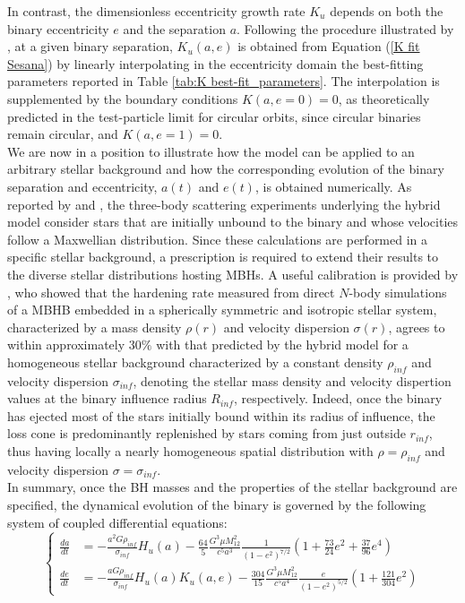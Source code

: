 \documentclass[12pt,twoside,openany]{book}
\begin{document}
In contrast, the dimensionless eccentricity growth rate $K_u$ depends on both the binary eccentricity $e$ and the separation $a$. Following the procedure illustrated by \textcite{Sesana_2010}, at a given binary separation, $K_u(a,e)$ is obtained from Equation (\ref{K fit Sesana}) by linearly interpolating in the eccentricity domain the best-fitting parameters reported in Table \ref{tab:K best-fit_parameters}. The interpolation is supplemented by the boundary conditions $K(a,e=0)=0$, as theoretically predicted in the test-particle limit for circular orbits, since circular binaries remain circular, and $K(a,e=1)=0$.\\We are now in a position to illustrate how the model can be applied to an arbitrary stellar background and how the corresponding evolution of the binary separation and eccentricity, $a(t)$ and $e(t)$, is obtained numerically. As reported by \textcite{Quinlan_1996} and \textcite{Sesana_2006}, the three-body scattering experiments underlying the hybrid model consider stars that are initially unbound to the binary and whose velocities follow a Maxwellian distribution. Since these calculations are performed in a specific stellar background, a prescription is required to extend their results to the diverse stellar distributions hosting MBHs. A useful calibration is provided by \textcite{Sesana_2015}, who showed that the hardening rate measured from direct $N$-body simulations of a MBHB embedded in a spherically symmetric and isotropic stellar system, characterized by a mass density $\rho(r)$ and velocity dispersion $\sigma(r)$, agrees to within approximately $30\%$ with that predicted by the hybrid model for a homogeneous stellar background characterized by a constant density $\rho_{inf}$ and velocity dispersion $\sigma_{inf}$, denoting the stellar mass density and velocity dispertion values at the binary influence radius $R_{inf}$, respectively. Indeed, once the binary has ejected most of the stars initially bound within its radius of influence, the loss cone is predominantly replenished by stars coming from just outside $r_{inf}$, thus having locally a nearly homogeneous spatial distribution with $\rho=\rho_{inf}$ and velocity dispersion $\sigma=\sigma_{inf}$.\\In summary, once the BH masses and the properties of the stellar background are specified, the dynamical evolution of the binary is governed by the following system of coupled differential equations:
\begin{equation}
\left\{
\begin{aligned}
\frac{da}{dt} &=-\frac{a^2 G \rho_{inf}}{\sigma_{inf}}H_u(a)-\frac{64}{5} \frac{G^3 \mu M_{12}^2}{c^5 a^3} \frac{1}{(1 - e^2)^{7/2}} \left( 1 + \frac{73}{24}e^2 + \frac{37}{96}e^4 \right)    \\
\frac{de}{dt} &= -\frac{a G \rho_{inf}}{\sigma_{inf}}H_u(a)K_u(a,e) -\frac{304}{15} \frac{G^3 \mu M_{12}^2}{c^5 a^4}  \frac{e}{(1 - e^2)^{5/2}} \left( 1 + \frac{121}{304}e^2 \right)
\end{aligned}
\right.
\label{hybrid model used differential equations}
\end{equation}
\end{document}

